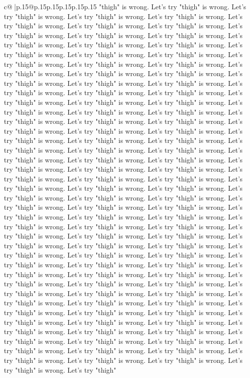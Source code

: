 \documentclass{article}
\begin{document}
{\begin{supertabular}{c@{$\;$}|p{.15\linewidth}@{}p{.15\linewidth}p{.15\linewidth}p{.15\linewidth}p{.15\linewidth}p{.15\linewidth}}
{{{"thigh" is wrong. Let's try "thigh" is wrong. Let's try "thigh" is wrong. Let's try "thigh" is wrong. Let's try "thigh" is wrong. Let's try "thigh" is wrong. Let's try "thigh" is wrong. Let's try "thigh" is wrong. Let's try "thigh" is wrong. Let's try "thigh" is wrong. Let's try "thigh" is wrong. Let's try "thigh" is wrong. Let's try "thigh" is wrong. Let's try "thigh" is wrong. Let's try "thigh" is wrong. Let's try "thigh" is wrong. Let's try "thigh" is wrong. Let's try "thigh" is wrong. Let's try "thigh" is wrong. Let's try "thigh" is wrong. Let's try "thigh" is wrong. Let's try "thigh" is wrong. Let's try "thigh" is wrong. Let's try "thigh" is wrong. Let's try "thigh" is wrong. Let's try "thigh" is wrong. Let's try "thigh" is wrong. Let's try "thigh" is wrong. Let's try "thigh" is wrong. Let's try "thigh" is wrong. Let's try "thigh" is wrong. Let's try "thigh" is wrong. Let's try "thigh" is wrong. Let's try "thigh" is wrong. Let's try "thigh" is wrong. Let's try "thigh" is wrong. Let's try "thigh" is wrong. Let's try "thigh" is wrong. Let's try "thigh" is wrong. Let's try "thigh" is wrong. Let's try "thigh" is wrong. Let's try "thigh" is wrong. Let's try "thigh" is wrong. Let's try "thigh" is wrong. Let's try "thigh" is wrong. Let's try "thigh" is wrong. Let's try "thigh" is wrong. Let's try "thigh" is wrong. Let's try "thigh" is wrong. Let's try "thigh" is wrong. Let's try "thigh" is wrong. Let's try "thigh" is wrong. Let's try "thigh" is wrong. Let's try "thigh" is wrong. Let's try "thigh" is wrong. Let's try "thigh" is wrong. Let's try "thigh" is wrong. Let's try "thigh" is wrong. Let's try "thigh" is wrong. Let's try "thigh" is wrong. Let's try "thigh" is wrong. Let's try "thigh" is wrong. Let's try "thigh" is wrong. Let's try "thigh" is wrong. Let's try "thigh" is wrong. Let's try "thigh" is wrong. Let's try "thigh" is wrong. Let's try "thigh" is wrong. Let's try "thigh" is wrong. Let's try "thigh" is wrong. Let's try "thigh" is wrong. Let's try "thigh" is wrong. Let's try "thigh" is wrong. Let's try "thigh" is wrong. Let's try "thigh" is wrong. Let's try "thigh" is wrong. Let's try "thigh" is wrong. Let's try "thigh" is wrong. Let's try "thigh" is wrong. Let's try "thigh" is wrong. Let's try "thigh" is wrong. Let's try "thigh" is wrong. Let's try "thigh" is wrong. Let's try "thigh" is wrong. Let's try "thigh" is wrong. Let's try "thigh" is wrong. Let's try "thigh" is wrong. Let's try "thigh" is wrong. Let's try "thigh" is wrong. Let's try "thigh" is wrong. Let's try "thigh" is wrong. Let's try "thigh" is wrong. Let's try "thigh" is wrong. Let's try "thigh" is wrong. Let's try "thigh" is wrong. Let's try "thigh" is wrong. Let's try "thigh" is wrong. Let's try "thigh" is wrong. Let's try "thigh" is wrong. Let's try "thigh" is wrong. Let's try "thigh" is wrong. Let's try "thigh" is wrong. Let's try "thigh" is wrong. Let's try "thigh" is wrong. Let's try "thigh" is wrong. Let's try "thigh" is wrong. Let's try "thigh" is wrong. Let's try "thigh" is wrong. Let's try "thigh" is wrong. Let's try "thigh" is wrong. Let's try "thigh" is wrong. Let's try "thigh" is wrong. Let's try "thigh" is wrong. Let's try "thigh" is wrong. Let's try "thigh" }}}
\end{supertabular}}
\end{document}
